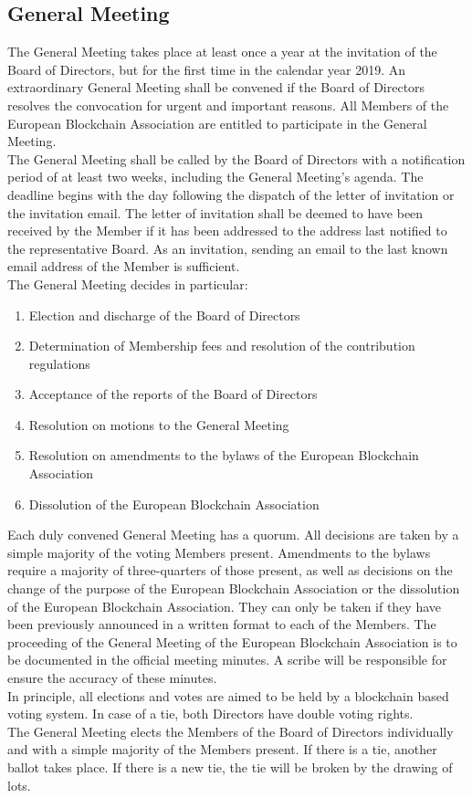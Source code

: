 \documentclass{article}
\begin{document}
\subsection{General Meeting}

The General Meeting takes place at least once a year at the invitation of the Board of Directors, but for the first time in the calendar year 2019. 
An extraordinary General Meeting shall be convened if the Board of Directors resolves the convocation for urgent and important reasons. 
All Members of the European Blockchain Association are entitled to participate in the General Meeting. \\
The General Meeting shall be called by the Board of Directors with a notification period of at least two weeks, including the General Meeting's agenda. 
The deadline begins with the day following the dispatch of the letter of invitation or the invitation email. 
The letter of invitation shall be deemed to have been received by the Member if it has been addressed to the address last notified to the representative Board. 
As an invitation, sending an email to the last known email address of the Member is sufficient. \\

The General Meeting decides in particular:

\begin{enumerate}
	\item Election and discharge of the Board of Directors
	\item Determination of Membership fees and resolution of the contribution regulations
	\item Acceptance of the reports of the Board of Directors
	\item Resolution on motions to the General Meeting
	\item Resolution on amendments to the bylaws of the European Blockchain Association
	\item Dissolution of the European Blockchain Association	
\end{enumerate}

Each duly convened General Meeting has a quorum. All decisions are taken by a simple majority of the voting Members present. 
Amendments to the bylaws require a majority of three-quarters of those present, as well as decisions on the change of the purpose of the European Blockchain Association or the dissolution of the European Blockchain Association. 
They can only be taken if they have been previously announced in a written format to each of the Members. 
The proceeding of the General Meeting of the European Blockchain Association is to be documented in the official meeting minutes. 
A scribe will be responsible for ensure the accuracy of these minutes. \\
In principle, all elections and votes are aimed to be held by a blockchain based voting system. 
In case of a tie, both Directors have double voting rights. \\
The General Meeting elects the Members of the Board of Directors individually and with a simple majority of the Members present. 
If there is a tie, another ballot takes place. If there is a new tie, the tie will be broken by the drawing of lots.
\end{document}
